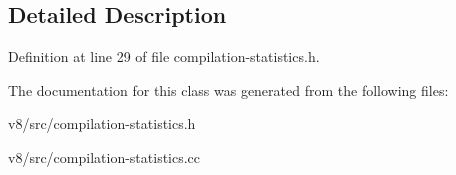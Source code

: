 \subsection{Detailed Description}


Definition at line 29 of file compilation-\/statistics.\+h.



The documentation for this class was generated from the following files\+:\begin{DoxyCompactItemize}
\item 
v8/src/compilation-\/statistics.\+h\item 
v8/src/compilation-\/statistics.\+cc\end{DoxyCompactItemize}
